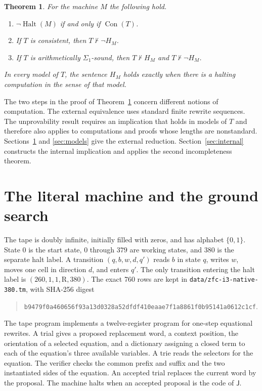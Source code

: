 \documentclass[11pt,letterpaper]{article}
\newtheorem{theorem}{Theorem}[section]
\newcommand{\Con}{\operatorname{Con}}
\newcommand{\Halt}{\operatorname{Halt}}
\newcommand{\code}[1]{\texttt{\nolinkurl{#1}}}
\newcommand{\J}{\mathsf J}
\begin{document}
\begin{theorem}\label{thm:main}
For the machine $M$ the following hold.
\begin{enumerate}
\item $\neg\Halt(M)$ if and only if $\Con(T)$.
\item If $T$ is consistent, then $T\nvdash\neg H_M$.
\item If $T$ is arithmetically $\Sigma_1$-sound, then
      $T\nvdash H_M$ and $T\nvdash\neg H_M$.
\end{enumerate}
In every model of $T$, the sentence $H_M$ holds exactly when there is a
halting computation in the sense of that model.
\end{theorem}

The two steps in the proof of
Theorem~\ref{thm:main} concern different notions of computation.
The external equivalence uses standard finite rewrite sequences.
The unprovability result requires an implication that holds in
models of $T$ and therefore also applies to computations and proofs
whose lengths are nonstandard. Sections~\ref{sec:machine} and
\ref{sec:models} give the external reduction. Section~\ref{sec:internal}
constructs the internal implication and applies the second
incompleteness theorem.

\section{The literal machine and the ground search}\label{sec:machine}

The tape is doubly infinite, initially filled with zeros, and has
alphabet $\{0,1\}$. State $0$ is the start state, $0$ through $379$ are
working states, and $380$ is the separate halt label. A transition
$(q,b,w,d,q')$ reads $b$ in state $q$, writes $w$, moves one cell in
direction $d$, and enters $q'$. The only transition entering the halt
label is $(260,1,1,\mathrm R,380)$. The exact 760 rows are kept in
\code{data/zfc-i3-native-380.tm}, with SHA-256 digest
\begin{quote}\small
\nolinkurl{b9479f0a460656f93a13d0328a52dfdf410eaae7f1a8861f0b95141a0612c1cf}.
\end{quote}

The tape program implements a twelve-register program for one-step
equational rewrites.
A trial gives a proposed replacement word, a context position, the
orientation of a selected equation, and a dictionary assigning a
closed term to each of the equation's three available variables.
A trie reads the selectors for the equation. The verifier checks the
common prefix and suffix and the two instantiated sides of the
equation. An accepted trial replaces the current word by the proposal.
The machine halts when an accepted proposal is the code of $\J$.
\end{document}
